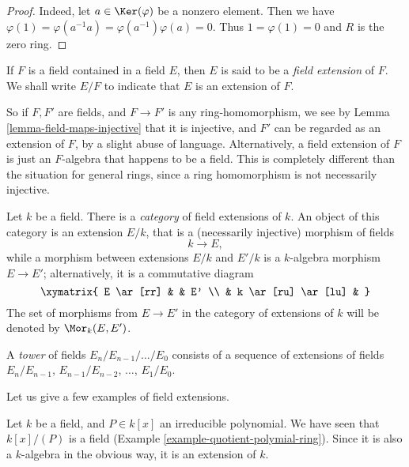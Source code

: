 \begin{proof}
Indeed, let $a \in \Ker(\varphi)$ be a nonzero element. Then we have
$\varphi(1) = \varphi(a^{-1} a) = \varphi(a^{-1}) \varphi(a) = 0$.
Thus $1 = \varphi(1) = 0$ and $R$ is the zero ring.
\end{proof}

\begin{definition}
\label{definition-extension}
If $F$ is a field contained in a field $E$, then $E$ is said
to be a {\it field extension} of $F$. We shall write $E/F$ to indicate
that $E$ is an extension of $F$.
\end{definition}

\noindent
So if $F, F'$ are fields, and $F \to F'$ is any ring-homomorphism, we see by
Lemma \ref{lemma-field-maps-injective} that it is injective, and $F'$ can be
regarded as an extension of $F$, by a slight abuse of language. Alternatively,
a field extension of $F$ is just an $F$-algebra that happens to be a field.
This is completely different than the situation for general rings, since a
ring homomorphism is not necessarily injective.

\medskip\noindent
Let $k$ be a field. There is a {\it category} of field extensions of $k$.
An object of this category is an extension $E/k$, that is a
(necessarily injective) morphism of fields
$$
k \to E,
$$
while a morphism between extensions $E/k$ and $E'/k$ is a $k$-algebra
morphism $E \to E'$; alternatively, it is a commutative diagram
$$
\xymatrix{
E \ar[rr] & & E' \\
& k \ar[ru] \ar[lu] &
}
$$
The set of morphisms from $E \to E'$ in the category of extensions of $k$
will be denoted by $\Mor_k(E, E')$.

\begin{definition}
\label{definition-tower}
A {\it tower} of fields $E_n/E_{n - 1}/\ldots/E_0$ consists of a sequence of
extensions of fields
$E_n/E_{n - 1}$, $E_{n - 1}/E_{n - 2}$, $\ldots$, $E_1/E_0$.
\end{definition}

\noindent
Let us give a few examples of field extensions.

\begin{example}
\label{example-monogenic-extension}
Let $k$ be a field, and $P \in k[x]$ an irreducible polynomial. We have
seen that $k[x]/(P)$ is a field (Example \ref{example-quotient-polymial-ring}).
Since it is also a $k$-algebra in the obvious way, it is an extension of $k$.
\end{example}

